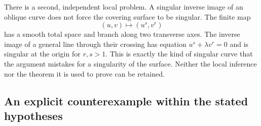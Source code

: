 There is a second, independent local problem. A singular inverse image of an oblique curve does not force the covering surface to be singular. The finite map
\[
 (u,v)\longmapsto(u^s,v^r)
\]
has a smooth total space and branch along two transverse axes. The inverse image of a general line through their crossing has equation $u^s+\lambda v^r=0$ and is singular at the origin for $r,s>1$. This is exactly the kind of singular curve that the argument mistakes for a singularity of the surface. Neither the local inference nor the theorem it is used to prove can be retained.

\subsection{An explicit counterexample within the stated hypotheses}

